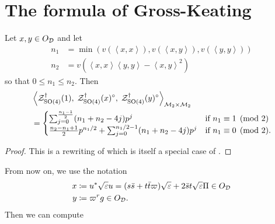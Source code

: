 \section{The formula of Gross-Keating}
\begin{proposition}
  Let $x,y \in O_\mathcal D$ and let
  \begin{align*}
    n_1 &= \min\left( v(\left\langle x,x \right\rangle), v(\left\langle x,y \right\rangle), v(\left\langle y,y \right\rangle) \right) \\
    n_2 &= v\left( \left\langle x,x \right\rangle \left\langle y,y \right\rangle - \left\langle x,y \right\rangle^2 \right)
  \end{align*}
  so that $0 \le n_1 \le n_2$.
  Then
  \begin{align*}
    &\left< \mathcal Z^{\dagger}_{\operatorname{SO}(4)}(1), \; \mathcal Z^{\dagger}_{\operatorname{SO}(4)}(x)^\circ, \; \mathcal Z^{\dagger}_{\operatorname{SO}(4)}(y)^\circ \right>_{\mathcal M_2 \times \mathcal M_2} \\
    &=
    \begin{cases}
      \sum_{j=0}^{\frac{n_1-1}{2}} (n_1+n_2-4j) p^j & \text{if } n_1 \equiv 1 \pmod 2 \\
      \frac{n_2-n_1+1}{2} p^{n_1/2} + \sum_{j=0}^{n_1/2-1} (n_1+n_2-4j) p^j & \text{if } n_1 \equiv 0 \pmod 2.
    \end{cases}
  \end{align*}
\end{proposition}
\begin{proof}
  This is a rewriting of \cite[Proposition 14.6]{ref:Kudla1997}
  which is itself a special case of \cite[Proposition 5.4]{ref:GK}.
\end{proof}
From now on, we use the notation
\begin{align*}
  x &\coloneqq u^\ast \sqrt{\varepsilon} u = (s \bar s + t \bar t \varpi) \sqrt{\varepsilon} + 2 \bar s t \sqrt{\varepsilon} \Pi \in O_\mathcal D \\
  y &\coloneqq \varpi^r g \in O_\mathcal D.
\end{align*}
Then we can compute
